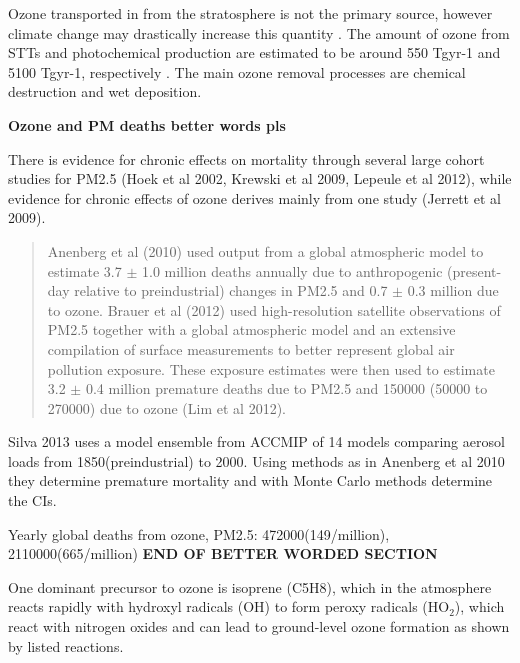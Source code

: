 Ozone transported in from the stratosphere is not the primary source, however climate change may drastically increase this quantity \cite{Hegglin_2009}.
The amount of ozone from STTs and photochemical production are estimated to be around 550 Tgyr-1 and 5100 Tgyr-1, respectively \cite{Stevenson_2006}. 
The main ozone removal processes are chemical destruction and wet deposition.
  
\textbf{Ozone and PM deaths better words pls}

There is evidence for chronic effects on mortality through several large cohort studies for PM2.5 (Hoek et al 2002, Krewski et al 2009, Lepeule et al 2012), while evidence for chronic effects of ozone derives mainly from one study (Jerrett et al 2009). 

\begin{quote}
Anenberg et al (2010) used output from a global atmospheric model to estimate 3.7 $\pm$ 1.0 million deaths annually due to anthropogenic (present-day relative to preindustrial) changes in PM2.5 and 0.7 $\pm$ 0.3 million due to ozone. Brauer et al (2012) used high-resolution satellite observations of PM2.5 together with a global atmospheric model and an extensive compilation of surface measurements to better represent global air pollution exposure. These exposure estimates were then used to estimate 3.2 $\pm$ 0.4 million premature deaths due to PM2.5 and 150000 (50000 to 270000) due to ozone (Lim et al 2012).
\end{quote} \cite{Silva_2013}

Silva 2013 uses a model ensemble from ACCMIP of 14 models comparing aerosol loads from 1850(preindustrial) to 2000. Using methods as in Anenberg et al 2010 they determine premature mortality and with Monte Carlo methods determine the CIs.

Yearly global deaths from ozone, PM2.5:
472000(149/million), 2110000(665/million) \cite{Silva_2013}
\textbf{END OF BETTER WORDED SECTION}

One dominant precursor to ozone is isoprene (C5H8), which in the atmosphere reacts rapidly with hydroxyl radicals (OH) to form peroxy radicals (HO$_2$), which react with nitrogen oxides and can lead to ground-level ozone formation as shown by listed reactions.

  